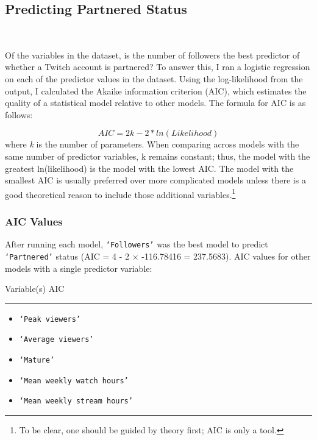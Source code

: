 \documentclass[12pt]{article}
\begin{document}
\subsection{Predicting Partnered Status}\

Of the variables in the dataset, is the number of followers the best predictor of whether a Twitch account is partnered? To answer this, I ran a logistic regression on each of the predictor values in the dataset. Using the log-likelihood from the output, I calculated the Akaike information criterion (AIC), which estimates the quality of a statistical model relative to other models. The formula for AIC is as follows:

\begin{equation}
AIC = 2k -2 \ast ln(Likelihood)
\end{equation}
where \emph{k} is the number of parameters. When comparing across models with the same number of predictor variables, k remains constant; thus, the model with the greatest ln(likelihood) is the model with the lowest AIC. The model with the smallest AIC is usually preferred over more complicated models unless there is a good theoretical reason to include those additional variables.\footnote{To be clear, one should be guided by theory first; AIC is only a tool.}

\subsubsection{AIC Values}

After running each model, \texttt{`Followers'} was the best model to predict \texttt{`Partnered'} status (AIC = 4 - 2 $\times$ -116.78416 = 237.5683).
\newline
\newline
\noindent AIC values for other models with a single predictor variable:

\noindent Variable(s) \hfill AIC 
\hspace{0.4em}
\hrule
\begin{itemize}
	\item \texttt{`Peak viewers'} 
	\item \texttt{`Average viewers'} 
	\item \texttt{`Mature'} 
	\item \texttt{`Mean weekly watch hours'} 
	\item \texttt{`Mean weekly stream hours'} 
\end{itemize}
\end{document}
